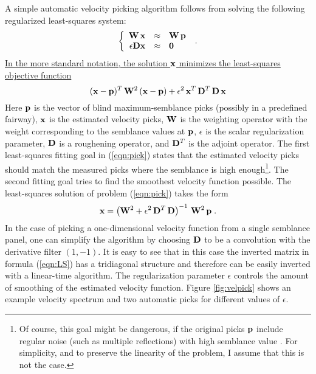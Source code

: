 A simple automatic velocity picking algorithm follows from solving the
following regularized least-squares system:
\begin{equation}
  \label{eqn:pick}
  \left\{\begin{array}{rcl}
      \bold{W}\,\bold{x} & \approx & \bold{W}\,\bold{p} \\
      \epsilon \bold{D} \bold{x} & \approx & \bold{0}
    \end{array}\right.\;.
\end{equation}
\uline{In the more standard notation, the solution $\bold{x}$ minimizes the
least-squares objective function}
\begin{equation}
  \label{eqn:ofpick}
(\bold{x}-\bold{p})^{T}\, \bold{W}^2\,(\bold{x}-\bold{p}) +
\epsilon^2\,\bold{x}^T\,\bold{D}^T\,\bold{D}\,\bold{x}
\end{equation}
Here $\bold{p}$ is the vector of blind maximum-semblance picks (possibly in a
predefined fairway), $\bold{x}$ is the estimated velocity picks, $\bold{W}$ is
the weighting operator with the weight corresponding to the semblance values
at $\bold{p}$, $\epsilon$ is the scalar regularization parameter, $\bold{D}$
is a roughening operator, and $\bold{D}^T$ is the adjoint operator.  The first
least-squares fitting goal in (\ref{eqn:pick}) states that the estimated
velocity picks should match the measured picks where the semblance is high
enough\footnote{Of course, this goal might be dangerous, if the original picks
  $\bold{p}$ include regular noise (such as multiple reflections) with high
  semblance value \cite{Toldi.sepphd.43}. For simplicity, and to preserve the
  linearity of the problem, I assume that this is not the case.}.  The second
fitting goal tries to find the smoothest velocity function possible.  The
least-squares solution of problem (\ref{eqn:pick}) takes the form
\begin{equation}
  \label{eqn:LS}
  \bold{x} = 
  \left(\bold{W}^2 + 
    \epsilon^2\,\bold{D}^T\,\bold{D}\right)^{-1}\,\bold{W}^2\,\bold{p}\;.
\end{equation}
In the case of picking a one-dimensional velocity function from a single
semblance panel, one can simplify the algorithm by choosing $\bold{D}$ to be a
convolution with the derivative filter $(1,-1)$. It is easy to see that in
this case the inverted matrix in formula (\ref{eqn:LS}) has a tridiagonal
structure and therefore can be easily inverted with a linear-time algorithm.
The regularization parameter $\epsilon$ controls the amount of smoothing of
the estimated velocity function.  Figure \ref{fig:velpick} shows an example
velocity spectrum and two automatic picks for different values of $\epsilon$.

